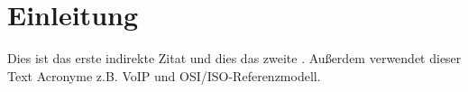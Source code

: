 \section{Einleitung}
\label{Einleitung}

\lipsum[3]
Dies ist das erste indirekte Zitat \cite{von_wagner_ip-umstellung:_2015} und dies das zweite \cite{goldberg_architectural_1973}.
\lipsum[3]
Außerdem verwendet dieser Text Acronyme z.B. \acrshort{VoIP} und \gls{OSI/ISO-Referenzmodell}.